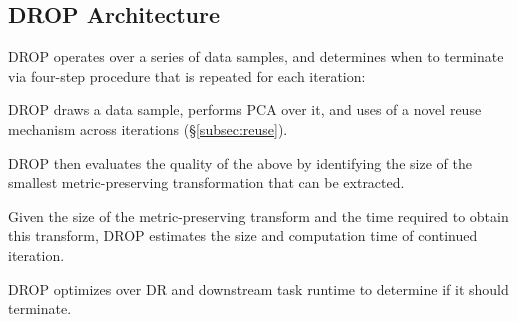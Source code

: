 \subsection{DROP Architecture}
\label{subsec:arch}
DROP operates over a series of data samples, and determines when to terminate via  four-step procedure that is repeated for each iteration: %




\noindent DROP draws a data sample, performs PCA over it, and uses of a novel reuse mechanism across iterations (\S\ref{subsec:reuse}).


\noindent DROP then evaluates the quality of the above by identifying the size of the smallest metric-preserving transformation that can be extracted. 


\noindent Given the size of the metric-preserving transform and the time required to obtain this transform, DROP estimates the size and computation time of continued iteration.


\noindent DROP optimizes over DR and downstream task runtime to determine if it should terminate.

